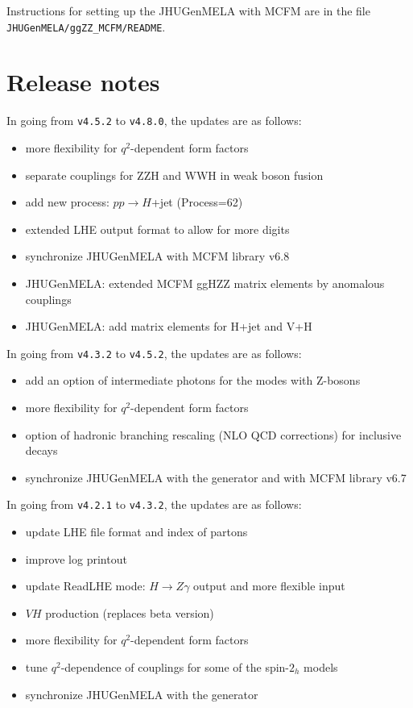 \documentclass[aps,superscriptaddress,nofootinbib]{revtex4}
\begin{document}
Instructions for setting up the JHUGenMELA with MCFM are in the file \verb|JHUGenMELA/ggZZ_MCFM/README|.


\section{ Release notes }


\noindent
In going from \verb|v4.5.2| to \verb|v4.8.0|, the updates are as follows:

\begin{itemize}
\item more flexibility for $q^2$-dependent form factors
\item separate couplings for ZZH and WWH in weak boson fusion
\item add new process: $pp\to H$+jet (Process=62)
\item extended LHE output format to allow for more digits
\item synchronize JHUGenMELA with MCFM library v6.8
\item JHUGenMELA: extended MCFM ggHZZ matrix elements by anomalous couplings
\item JHUGenMELA: add matrix elements for H+jet and V+H
\end{itemize}



\noindent
In going from \verb|v4.3.2| to \verb|v4.5.2|, the updates are as follows:

\begin{itemize}
\item add an option of intermediate photons for the modes with Z-bosons
\item more flexibility for $q^2$-dependent form factors
\item option of hadronic branching rescaling (NLO QCD corrections) for inclusive decays
\item synchronize JHUGenMELA with the generator and with MCFM library v6.7
\end{itemize}

\noindent
In going from \verb|v4.2.1| to \verb|v4.3.2|, the updates are as follows:

\begin{itemize}
\item update LHE file format and index of partons 
\item improve log printout
\item update ReadLHE mode: $H\to Z\gamma$ output and more flexible input
\item $VH$ production (replaces beta version)
\item more flexibility for $q^2$-dependent form factors
\item tune $q^2$-dependence of couplings for some of the spin-$2_h$ models
\item synchronize JHUGenMELA with the generator
\end{itemize}
\end{document}
